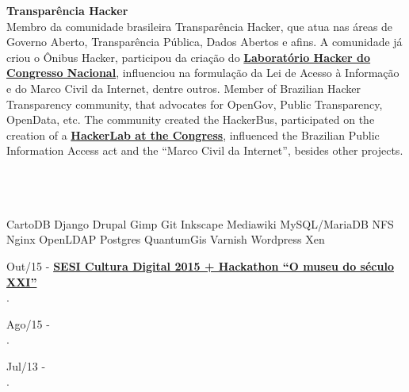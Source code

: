 \documentclass[]{friggeri-cv}
\begin{document}
\textbf{Transparência Hacker }\\
%
{Membro da comunidade brasileira Transparência Hacker, que atua nas áreas de Governo Aberto, Transparência Pública, Dados Abertos e afins. A comunidade já criou o Ônibus Hacker, participou da criação do \href{http://blog.openingparliament.org/post/72099651071/a-permanent-hacker-space-in-the-brazilian-congress}{\textbf{Laboratório Hacker do Congresso Nacional}}, influenciou na formulação da Lei de Acesso à Informação e do Marco Civil da Internet, dentre outros.}%
{Member of Brazilian Hacker Transparency community, that advocates for OpenGov, Public Transparency, OpenData, etc. The community created the HackerBus, participated on the creation of a \href{http://blog.openingparliament.org/post/72099651071/a-permanent-hacker-space-in-the-brazilian-congress}{\textbf{HackerLab at the Congress}}, influenced the Brazilian Public Information Access act and the ``Marco Civil da Internet'', besides other projects.}

\newpage
{}%
\begin{aside}
~
~
~
  \section{}
    CartoDB
    Django
    Drupal
    Gimp
  	Git
    Inkscape
    Mediawiki
    MySQL/MariaDB
    NFS
    Nginx
    OpenLDAP
    Postgres
    QuantumGis
    Varnish
    Wordpress
    Xen
\end{aside}

{\footnotesize{Out/15}}  - \href{http://www.hackagenda.com.br/evento/sesi-cultura-digital-2015-hackathon-o-museu-do-seculo-xxi/}{\textbf{SESI Cultura Digital 2015 + Hackathon “O museu do século XXI”}}\\
.

{\footnotesize{Ago/15}}  - \href{******}{\textbf{}}\\
.

{\footnotesize{Jul/13}}  - \href{http://abraji.org.br/congresso/}{\textbf{}}\\
.
\end{document}
